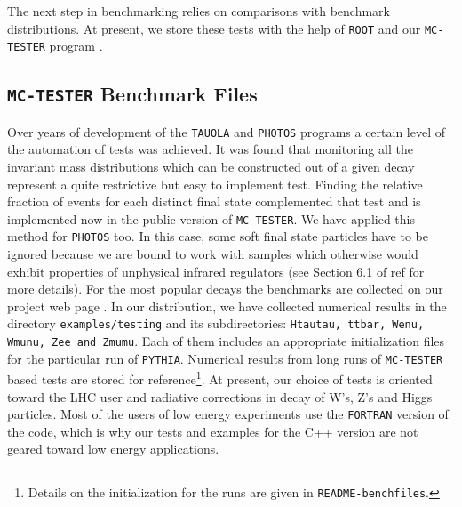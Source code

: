 \documentclass[]{Photos_interface_design}
\begin{document}
The next step in benchmarking relies on comparisons with benchmark distributions. 
At present, we store these tests with the help of {\tt ROOT} \cite{Antcheva:2009zz} and our {\tt MC-TESTER} program \cite{Davidson:2008ma}.



\subsection{{\tt MC-TESTER} Benchmark Files}



Over years of development of the {\tt TAUOLA} and {\tt PHOTOS} programs a certain level 
of the automation of tests was achieved. It was found that monitoring all the invariant mass distributions which can be constructed out of a given decay represent 
a quite restrictive but easy to implement test.
Finding the relative fraction of events for each distinct final state 
 complemented that test and is implemented now in the public version of {\tt MC-TESTER}. 
We have applied this method 
for {\tt PHOTOS} too. In this case, some soft final state particles have to be ignored because we are bound to  work with  samples which otherwise would
exhibit properties of unphysical infrared regulators (see Section 6.1 of 
ref \cite{Davidson:2008ma} for more details). For the most popular 
decays the benchmarks are collected on our project web page \cite{Photos_tests}.
In our distribution, we have collected numerical results in the directory
{\tt examples/testing} and its subdirectories:  
{\tt Htautau, ttbar, Wenu, Wmunu, Zee and Zmumu}. Each of them includes
an appropriate initialization files for the particular run of {\tt PYTHIA}. Numerical results from long runs of {\tt MC-TESTER} based tests
are stored for reference\footnote{Details on the initialization for the 
runs are given in 
{\tt README-benchfiles}.}. At present, our choice of tests is oriented toward 
the LHC user and radiative corrections in decay of W's, Z's and Higgs particles.
Most of the users of low energy experiments use the {\tt FORTRAN} version 
of the code, which is why our tests and examples for the C++ version are not geared toward 
low energy applications.
\end{document}
